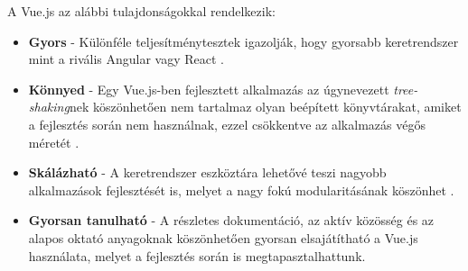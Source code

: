 \documentclass[12pt]{article}
\begin{document}
A Vue.js az alábbi tulajdonságokkal rendelkezik:
\begin{itemize}
	\item[]\textbf{Gyors}
	- Különféle teljesítménytesztek igazolják, hogy gyorsabb keretrendszer mint a rivális Angular vagy React \cite{FRAMEWORK_PERF}.
	\item[]\textbf{Könnyed}
	- Egy Vue.js-ben fejlesztett alkalmazás az úgynevezett \textit{tree-shaking}nek köszönhetően nem tartalmaz olyan beépített könyvtárakat, amiket a fejlesztés során nem használnak, ezzel csökkentve az alkalmazás végős méretét \cite{VUE_LW}.
	\item[]\textbf{Skálázható}
	- A keretrendszer eszköztára lehetővé teszi nagyobb alkalmazások fejlesztését is, melyet a nagy fokú modularitásának köszönhet \cite{VUE_SCALE}.
	\item[]\textbf{Gyorsan tanulható}
	- A részletes dokumentáció, az aktív közösség és az alapos oktató anyagoknak köszönhetően gyorsan elsajátítható a Vue.js használata, melyet a fejlesztés során is megtapasztalhattunk.
\end{itemize}
\end{document}
